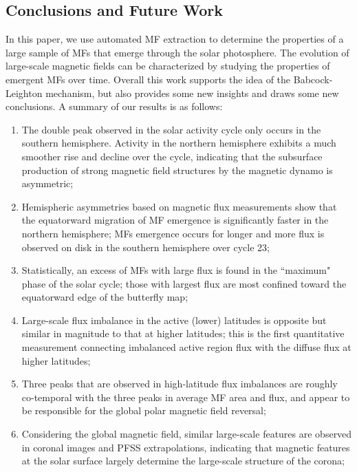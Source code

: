\documentclass[namedreferences]{solarphysics}
\begin{document}
\begin{article}
\section{Conclusions and Future Work}\label{discussion}

In this paper, we use automated MF extraction to determine the properties of a large sample of MFs that emerge through the solar photosphere. The evolution of large-scale magnetic fields can be characterized by studying the properties of emergent MFs over time. Overall this work supports the idea of the Babcock-Leighton mechanism, but also provides some new insights and draws some new conclusions. A summary of our results is as follows: 
\begin{enumerate}

\item The double peak observed in the solar activity cycle only occurs in the southern hemisphere. Activity in the northern hemisphere exhibits a much smoother rise and decline over the cycle, indicating that the subsurface production of strong magnetic field structures by the magnetic dynamo is asymmetric;

\item Hemispheric asymmetries based on magnetic flux measurements show that the equatorward migration of MF emergence is significantly faster in the northern hemisphere; MFs emergence occurs for longer and more flux is observed on disk in the southern hemisphere over cycle 23;

\item Statistically, an excess of MFs with large flux is found in the ``maximum" phase of the solar cycle; those with largest flux are most confined toward the equatorward edge of the butterfly map;

\item Large-scale flux imbalance in the active (lower) latitudes is opposite but similar in magnitude to that at higher latitudes; this is the first quantitative measurement connecting imbalanced active region flux with the diffuse flux at higher latitudes;

\item Three peaks that are observed in high-latitude flux imbalances are roughly co-temporal with the three peaks in average MF area and flux, and appear to be responsible for the global polar magnetic field reversal;

\item Considering the global magnetic field, similar large-scale features are observed in coronal images and PFSS extrapolations, indicating that magnetic features at the solar surface largely determine the large-scale structure of the corona;


\end{enumerate}
\end{article}
\end{document}
